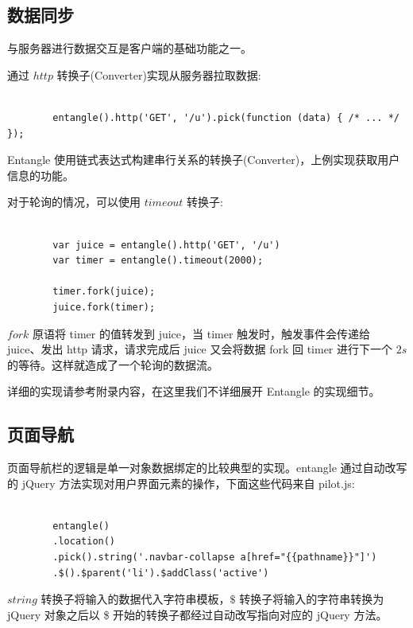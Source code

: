 \subsection{数据同步}

与服务器进行数据交互是客户端的基础功能之一。

通过 $http$ 转换子(Converter)实现从服务器拉取数据:

\begin{verbatim}

        entangle().http('GET', '/u').pick(function (data) { /* ... */ });

\end{verbatim}

Entangle 使用链式表达式构建串行关系的转换子(Converter)，上例实现获取用户信息的功能。

对于轮询的情况，可以使用 $timeout$ 转换子:

\begin{verbatim}

        var juice = entangle().http('GET', '/u')
        var timer = entangle().timeout(2000);

        timer.fork(juice);
        juice.fork(timer);

\end{verbatim}

$fork$ 原语将 timer 的值转发到 juice，当 timer 触发时，触发事件会传递给 juice、发出 http 请求，请求完成后 juice 又会将数据 fork 回 timer 进行下一个 $2s$ 的等待。这样就造成了一个轮询的数据流。

详细的实现请参考附录内容，在这里我们不详细展开 Entangle 的实现细节。

\subsection{页面导航}

页面导航栏的逻辑是单一对象数据绑定的比较典型的实现。entangle 通过自动改写的 jQuery 方法实现对用户界面元素的操作，下面这些代码来自 pilot.js:

\begin{verbatim}

        entangle()
        .location()
        .pick().string('.navbar-collapse a[href="{{pathname}}"]')
        .$().$parent('li').$addClass('active')

\end{verbatim}

$string$ 转换子将输入的数据代入字符串模板，$\$$ 转换子将输入的字符串转换为 jQuery 对象之后以 \$ 开始的转换子都经过自动改写指向对应的 jQuery 方法。

